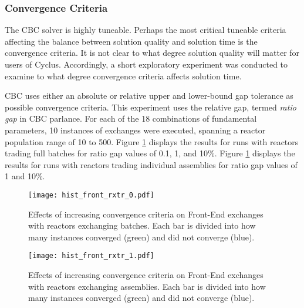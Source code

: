 
\subsubsection{Convergence Criteria}

The CBC solver is highly tuneable. Perhaps the most critical tuneable criteria
affecting the balance between solution quality and solution time is the
convergence criteria. It is not clear to what degree solution quality will
matter for users of Cyclus. Accordingly, a short exploratory experiment was
conducted to examine to what degree convergence criteria affects solution time.

CBC uses either an absolute or relative upper and lower-bound gap tolerance as
possible convergence criteria. This experiment uses the relative gap, termed
\textit{ratio gap} in CBC parlance. For each of the 18 combinations of
fundamental parameters, 10 instances of exchanges were executed, spanning a
reactor population range of 10 to 500. Figure \ref{fig:hist_front_rxtr_0}
displays the results for runs with reactors trading full batches for ratio gap
values of 0.1, 1, and 10\%. Figure \ref{fig:hist_front_rxtr_0} displays the
results for runs with reactors trading individual assemblies for ratio gap
values of 1 and 10\%.

\begin{figure}[h!]
  \begin{center}
    \texttt{[image: hist\_front\_rxtr\_0.pdf]}
    \caption[]{
      \label{fig:hist_front_rxtr_0}
      Effects of increasing convergence criteria on Front-End exchanges with
      reactors exchanging batches. Each bar is divided into how many instances
      converged (green) and did not converge (blue). }
  \end{center}
\end{figure}

\begin{figure}[h!]
  \begin{center}
    \texttt{[image: hist\_front\_rxtr\_1.pdf]}
    \caption[]{
      \label{fig:hist_front_rxtr_1}
      Effects of increasing convergence criteria on Front-End exchanges with
      reactors exchanging assemblies. Each bar is divided into how many instances
      converged (green) and did not converge (blue).}
  \end{center}
\end{figure}


